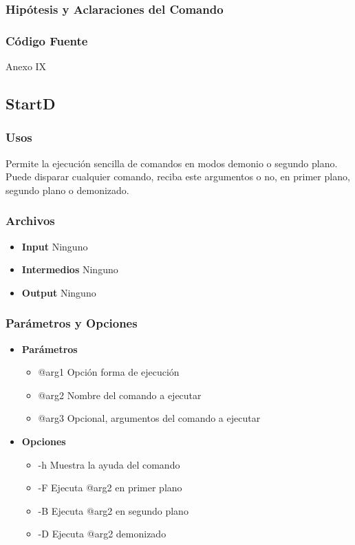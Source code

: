 \documentclass[a4paper,10pt,titlepage]{article}
\begin{document}
		\subsubsection{Hip\'otesis y Aclaraciones del Comando}

		\subsubsection{C\'odigo Fuente}
			Anexo IX

	\subsection{StartD}
		\subsubsection{Usos}
			Permite la ejecuci\'on sencilla de comandos en modos demonio o segundo plano. Puede disparar cualquier comando, reciba este argumentos o no, en primer plano, segundo plano o demonizado.

		\subsubsection{Archivos}
			\begin {itemize}
				\item \textbf{Input } {Ninguno}
				\item \textbf{Intermedios } {Ninguno}
				\item \textbf{Output } {Ninguno}
			\end{itemize}

		\subsubsection{Par\'ametros y Opciones}
			\begin {itemize}
				\item \textbf{Par\'ametros} {
					\begin{itemize}
						\item {@arg1 }{Opci\'on forma de ejecuci\'on} 
						\item {@arg2 }{Nombre del comando a ejecutar} 
						\item {@arg3 }{Opcional, argumentos del comando a ejecutar} 
					\end{itemize}
				}
				\item \textbf{Opciones}{
					\begin{itemize}
						\item {-h }{Muestra la ayuda del comando} 
						\item {-F }{Ejecuta @arg2 en primer plano} 
						\item {-B }{Ejecuta @arg2 en segundo plano}
						\item {-D }{Ejecuta @arg2 demonizado}
					\end{itemize}
				}
			\end{itemize}
	
\end{document}
